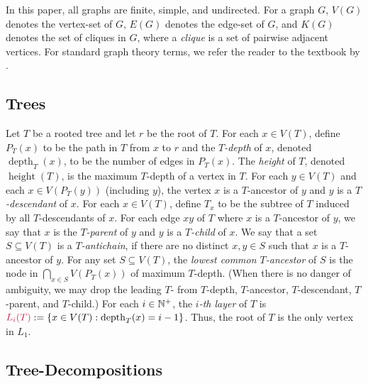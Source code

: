 \documentclass{patmorin}
\makeatletter
\newcommand{\david}[1]{{\color{orange} DW: #1}}
\newcommand{\pat}[1]{\textcolor{Magenta}{PaMo: #1}}
\newcommand{\piotr}[1]{\textcolor{red}{PiMi: #1}}
\DeclareMathOperator{\height}{height}
\DeclareMathOperator{\depth}{depth}
\newcommand{\defin}[1]{\emph{\textcolor{brightmaroon}{#1}}}
\def\mathcolor#1#{\@mathcolor{#1}}
\def\@mathcolor#1#2#3{%
  \protect\leavevmode
  \begingroup
    \color#1{#2}#3%
  \endgroup
}
\newcommand{\mathdefin}[1]{\mathcolor{brightmaroon}{#1}}
\makeatother
\begin{document}
  In this paper, all graphs are finite, simple, and undirected.  For a graph $G$, \defin{$V(G)$} denotes the vertex-set of $G$, \defin{$E(G)$} denotes the edge-set of $G$, and \defin{$K(G)$} denotes the set of cliques in $G$, where a \defin{clique} is a set of pairwise adjacent vertices. For standard graph theory terms, we refer the reader to the textbook by \citet{diestel:graph}.




  \subsection{Trees}

  Let $T$ be a rooted tree and let $r$ be the root of $T$. For each $x\in V(T)$, define \defin{$P_T(x)$} to be the path in $T$ from $x$ to $r$ and the \defin{$T$-depth} of $x$, denoted \defin{$\depth_T(x)$}, to be the number of edges in $P_T(x)$.
  The \defin{height} of $T$, denoted \defin{$\height(T)$}, is the maximum $T$-depth of a vertex in $T$.
  For each $y\in V(T)$ and each $x\in V(P_T(y))$ (including $y$),  the vertex $x$ is a $T$-ancestor of $y$ and $y$ is a \defin{$T$-descendant} of $x$.  For each $x\in V(T)$, define \defin{$T_x$} to be the subtree of $T$ induced by all $T$-descendants of $x$.
  For each edge $xy$ of $T$ where $x$ is a $T$-ancestor of $y$, we say that $x$ is the \defin{$T$-parent} of $y$ and $y$ is a \defin{$T$-child} of $x$.
  We say that a set $S\subseteq V(T)$ is a \defin{$T$-antichain}, if there are no distinct $x,y\in S$ such that $x$ is a $T$-ancestor of $y$.
  For any set $S\subseteq V(T)$, the \defin{lowest common $T$-ancestor} of $S$ is the node in $\bigcap_{x\in S} V(P_T(x))$ of maximum $T$-depth. (When there is no danger of ambiguity, we may drop the leading $T$- from $T$-depth, $T$-ancestor, $T$-descendant, $T$-parent, and $T$-child.)
  For each $i\in\mathbb{N}^+$, the \defin{$i$-th layer} of $T$ is $\mathdefin{L_i(T)}:=\{x\in V(T):\depth_T(x)=i-1\}$.
  Thus, the root of $T$ is the only vertex in $L_1$.


  \subsection{Tree-Decompositions}
\end{document}
